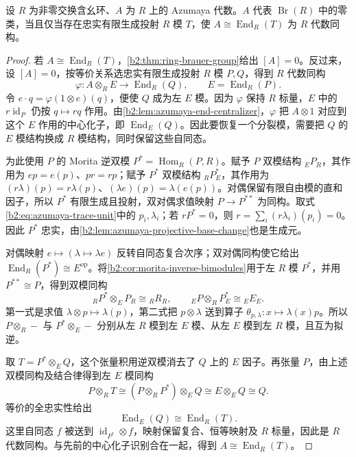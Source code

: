 \begin{proposition}\label{b2:prop:azumaya-zero-split}
	设 \(R\) 为非零交换含幺环、\(A\) 为 \(R\) 上的 Azumaya 代数。\(A\) 代表 \(\operatorname{Br}(R)\) 中的零类，当且仅当存在忠实有限生成投射 \(R\) 模 \(T\)，使 \(A\cong\operatorname{End}_R(T)\) 为 \(R\) 代数同构。
\end{proposition}
\begin{proof}
	若 \(A\cong\operatorname{End}_R(T)\)，\cref{b2:thm:ring-brauer-group}给出 \([A]=0\)。反过来，设 \([A]=0\)，按等价关系选忠实有限生成投射 \(R\) 模 \(P,Q\)，得到 \(R\) 代数同构
	\[
		\varphi:A\otimes_RE\longrightarrow\operatorname{End}_R(Q), \qquad E=\operatorname{End}_R(P).
	\]
	令 \(e\cdot q=\varphi(1\otimes e)(q)\)，便使 \(Q\) 成为左 \(E\) 模。因为 \(\varphi\) 保持 \(R\) 标量，\(E\) 中的 \(r\operatorname{id}_P\) 仍按 \(q\mapsto rq\) 作用。由\cref{b2:lem:azumaya-end-centralizer}，\(\varphi\) 把 \(A\otimes1\) 对应到这个 \(E\) 作用的中心化子，即 \(\operatorname{End}_E(Q)\)。因此要恢复一个分裂模，需要把 \(Q\) 的 \(E\) 模结构换成 \(R\) 模结构，同时保留这些自同态。

	为此使用 \(P\) 的 Morita 逆双模 \(P^*=\operatorname{Hom}_R(P,R)\)。赋予 \(P\) 双模结构 \({}_EP_R\)，其作用为 \(ep=e(p)\)、\(pr=rp\)；赋予 \(P^*\) 双模结构 \({}_RP^*_E\)，其作用为 \((r\lambda)(p)=r\lambda(p)\)、\((\lambda e)(p)=\lambda(e(p))\)。对偶保留有限自由模的直和因子，所以 \(P^*\) 有限生成且投射，双对偶求值映射 \(P\rightarrow P^{**}\) 为同构。取式\eqref{b2:eq:azumaya-trace-unit}中的 \(p_i,\lambda_i\)；若 \(rP^*=0\)，则 \(r=\sum_i(r\lambda_i)(p_i)=0\)。因此 \(P^*\) 忠实，由\cref{b2:lem:azumaya-projective-base-change}也是生成元。

	对偶映射 \(e\mapsto(\lambda\mapsto\lambda e)\) 反转自同态复合次序；双对偶同构使它给出 \(\operatorname{End}_R(P^*)\cong E^{\mathrm{op}}\)。将\cref{b2:cor:morita-inverse-bimodules}用于左 \(R\) 模 \(P^*\)，并用 \(P^{**}\cong P\)，得到双模同构
	\[
		{}_RP^*\otimes_EP_R\cong{}_RR_R, \qquad {}_EP\otimes_RP^*_E\cong{}_EE_E.
	\]
	第一式是求值 \(\lambda\otimes p\mapsto\lambda(p)\)，第二式把 \(p\otimes\lambda\) 送到算子 \(\theta_{p,\lambda}:x\mapsto\lambda(x)p\)。所以 \(P\otimes_R-\) 与 \(P^*\otimes_E-\) 分别从左 \(R\) 模到左 \(E\) 模、从左 \(E\) 模到左 \(R\) 模，且互为拟逆。

	取 \(T=P^*\otimes_EQ\)，这个张量积用逆双模消去了 \(Q\) 上的 \(E\) 因子。再张量 \(P\)，由上述双模同构及结合律得到左 \(E\) 模同构
	\[
		P\otimes_RT \cong (P\otimes_RP^*)\otimes_EQ \cong E\otimes_EQ \cong Q.
	\]
	等价的全忠实性给出
	\[
		\operatorname{End}_E(Q)\cong\operatorname{End}_R(T).
	\]
	这里自同态 \(f\) 被送到 \(\operatorname{id}_{P^*}\otimes f\)，映射保留复合、恒等映射及 \(R\) 标量，因此是 \(R\) 代数同构。与先前的中心化子识别合在一起，得到 \(A\cong\operatorname{End}_R(T)\)。


\end{proof}

